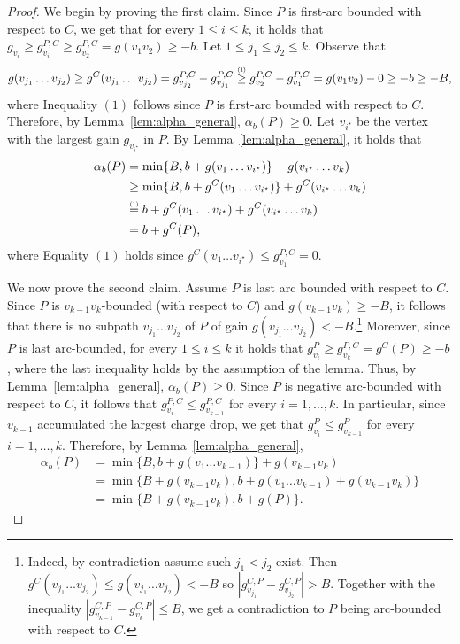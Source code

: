 \documentclass[11pt]{article}
\newcommand\numeq[1]{\stackrel{\scriptscriptstyle(\mkern-1.5mu#1\mkern-1.5mu)}{=}}
\newcommand\numge[1]{\stackrel{\scriptscriptstyle(\mkern-1.5mu#1\mkern-1.5mu)}{\ge}}
\begin{document}
\begin{proof}
     We begin by proving the first claim. Since $P$ is first-arc bounded with respect to $C$, we get that for every $1\le i \le k$, it holds that $g_{v_i} \ge g^{P,C}_{v_i} \ge g^{P,C}_{v_2} = g(v_1 v_2) \ge -b$. Let $1\le j_1 \le j_2 \le k$. Observe that
    \[g(v_{j_1} \ldots v_{j_2}) \ge g^C(v_{j_1} \ldots v_{j_2})  = g^{P,C}_{v_{j_2}} - g^{P,C}_{v_{j_1}} 
    \numge{1} g^{P,C}_{v_{2}} - g^{P,C}_{v_{1}} = g(v_1 v_2) -0\ge  -b \ge -B,
    \]
    where Inequality $(1)$ follows since $P$ is first-arc bounded with respect to $C$.
    Therefore, by Lemma~\ref{lem:alpha_general}, $\alpha_b(P)\ge 0$. Let $v_{i^\star}$ be the vertex with the largest gain $g_{v_{i^\star}}$ in $P$. By Lemma~\ref{lem:alpha_general}, it holds that 
    \begin{align*}
        \alpha_b(P) 
        &=  \min \{B, b + g(v_1\ldots v_{i^\star}) \} + g(v_{i^\star} \ldots v_k) 
        \\ &\ge
        \min \{B, b + g^C(v_1\ldots v_{i^\star}) \} + g^C(v_{i^\star} \ldots v_k)
        \\&\numeq{1}
        b + g^C(v_1\ldots v_{i^\star})  + g^C(v_{i^\star} \ldots v_k) 
        \\&= b + g^C(P),
    \end{align*}
    where Equality $(1)$ holds since  $g^C(v_1\ldots v_{i^\star}) \le g^{P,C}_{v_1} = 0$.

    We now prove the second claim. Assume $P$ is last arc bounded with respect to $C$. Since $P$ is $v_{k-1}v_k$-bounded (with respect to $C$) and $g(v_{k-1}v_k) \ge -B$, it follows that there is no subpath $v_{j_1}\ldots v_{j_2}$ of $P$ of gain $g(v_{j_1}\ldots v_{j_2}) < - B$.\footnote{Indeed, by contradiction assume such $j_1 < j_2$ exist. Then $g^C(v_{j_1}\ldots v_{j_2}) \le g(v_{j_1}\ldots v_{j_2}) < - B$ so $|g^{C,P}_{v_{j_1}} - g^{C,P}_{v_{j_2}}| > B$. Together with the inequality $|g^{C,P}_{v_{k-1}} - g^{C,P}_{v_{k}}| \le B$, we get a contradiction to $P$ being arc-bounded with respect to $C$.} Moreover, since $P$ is last arc-bounded, for every $1\le  i \le k$ it holds that $g^P_{v_i} \ge g^{P,C}_{v_k} = g^C(P) \ge -b$, where the last inequality holds by the assumption of the lemma. 
    Thus, by Lemma~\ref{lem:alpha_general}, $\alpha_b(P) \ge 0$.
    Since $P$ is  negative arc-bounded with respect to $C$, it follows that $g^{P,C}_{v_i} \le g^{P,C}_{v_{k-1}}$ for every $i=1,\ldots,k$. In particular, since $v_{k-1}$ accumulated the largest charge drop, 
    we get that $g^{P}_{v_i} \le g^{P}_{v_{k-1}}$ for every $i=1,\ldots,k$.
    Therefore, by Lemma~\ref{lem:alpha_general}, 
    \begin{align*}
    \alpha_b(P) &=  \min \{B, b + g(v_1\ldots v_{k-1}) \} + g(v_{k-1} v_k) \\
    &= \min \{B + g(v_{k-1} v_k), b + g(v_1\ldots v_{k-1}) + g(v_{k-1}v_k)\} \\
    &= \min \{B + g(v_{k-1} v_k), b + g(P) \}.        
    \end{align*}
\end{proof}
\end{document}
